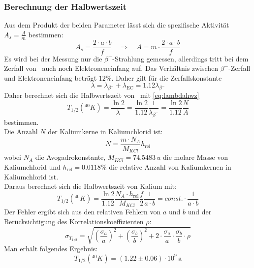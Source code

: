 \subsubsection{Berechnung der Halbwertszeit}
Aus dem Produkt der beiden Parameter lässt sich die spezifische Aktivität $A_s = \frac{A}{m}$ bestimmen:
\begin{equation}
  A_s = \frac{2 \cdot a \cdot b}{f} \quad \Rightarrow \quad A = m \cdot \frac{2 \cdot a \cdot b}{f}
\end{equation}
Es wird bei der Messung nur die $\beta^-$-Strahlung gemessen, allerdings tritt bei dem Zerfall von \kalium\, auch noch Elektroneneinfang auf. 
Das Verhältnis zwischen $\beta^-$-Zerfall und Elektroneneinfang beträgt $12\%$. Daher gilt für die Zerfallskonstante
\begin{equation}
  \lambda = \lambda_{\beta^-} + \lambda_{\text{EC}} = 1.12 \lambda_{\beta^-}
\end{equation}
Daher berechnet sich die Halbwertszeit von \kalium\, mit \autoref{eq:lambdahwz}
\begin{equation}
  T_{1/2}({}^{40}K) = \frac{\ln 2}{\lambda} = \frac{\ln 2}{1.12} \frac{1}{\lambda_{\beta^-}} = \frac{\ln 2}{1.12} \frac{N}{A}
\end{equation}
bestimmen. \\
Die Anzahl $N$ der Kaliumkerne in Kaliumchlorid ist:
\begin{equation}
  N = \frac{m \cdot N_A}{M_{KCl}} h_{\text{rel}}
\end{equation}
wobei $N_A$ die Avogadrokonstante, $M_{KCl}=74.5483\,u$ die molare Masse von Kaliumchlorid und $h_{\text{rel}}=0.0118\%$ die relative Anzahl von Kaliumkernen 
in Kaliumchlorid ist. \\
Daraus berechnet sich die Halbwertszeit von Kalium mit:
\begin{equation}
  T_{1/2} \left( {}^{40} K \right)  = \frac{\ln 2}{1.12} \frac{N_A \cdot h_{\text{rel}}}{M_{KCl}} \frac{f}{2} \frac{1}{a \cdot b} = const. \cdot \frac{1}{a \cdot b}
\end{equation}
Der Fehler ergibt sich aus den relativen Fehlern von $a$ und $b$ und der Berücksichtigung des Korrelationskoeffizienten $\rho$:
\begin{equation}
  \sigma_{T_{1/2}} = \sqrt{ \left( \frac{\sigma_a}{a} \right)^2 + \left( \frac{\sigma_b}{b} \right)^2 + 2 \cdot \frac{\sigma_a}{a} \cdot \frac{\sigma_b}{b} \cdot \rho   }
\end{equation}
Man erhält folgendes Ergebnis:
\begin{equation}
  T_{1/2} \left( {}^{40} K \right) = (1.22 \pm 0.06) \cdot 10^9\,\text{a}  
\end{equation}

